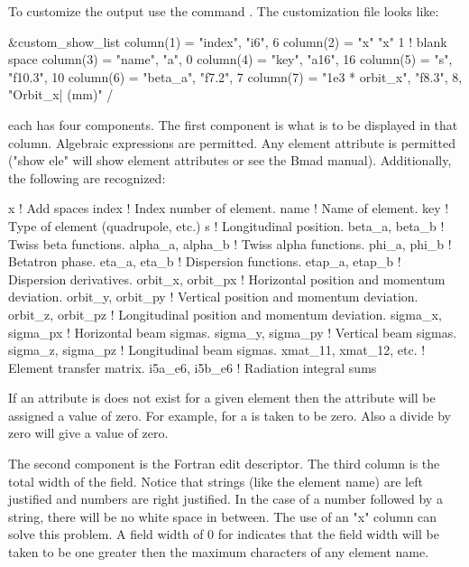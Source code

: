 {{{{\begin{description}
To customize the output use the command . The customization file looks like:
\begin{example}
  &custom_show_list
    column(1) = "index",   "i6",     6 
    column(2) = "x"        "x"       1       ! blank space
    column(3) = "name",    "a",      0
    column(4) = "key",     "a16",   16
    column(5) = "s",       "f10.3", 10
    column(6) = "beta_a",  "f7.2",   7
    column(7) = "1e3 * orbit_x", "f8.3", 8, "Orbit_x| (mm)" 
  /
\end{example}
each  has four components. The first component is what
is to be displayed in that column. Algebraic expressions are
permitted. Any element attribute is permitted ("show ele" will show
element attributes or see the Bmad manual). Additionally, the following
are recognized:
\begin{example}
  x                           ! Add spaces
  index                       ! Index number of element.
  name                        ! Name of element.
  key                         ! Type of element (quadrupole, etc.)
  s                           ! Longitudinal position.
  beta_a,  beta_b             ! Twiss beta functions.
  alpha_a, alpha_b            ! Twiss alpha functions.
  phi_a,   phi_b              ! Betatron phase.
  eta_a,   eta_b              ! Dispersion functions.
  etap_a,  etap_b             ! Dispersion derivatives.
  orbit_x, orbit_px           ! Horizontal position and momentum deviation.
  orbit_y, orbit_py           ! Vertical position and momentum deviation.
  orbit_z, orbit_pz           ! Longitudinal position and momentum deviation.
  sigma_x, sigma_px           ! Horizontal beam sigmas.
  sigma_y, sigma_py           ! Vertical beam sigmas.
  sigma_z, sigma_pz           ! Longitudinal beam sigmas.
  xmat_11, xmat_12, etc.      ! Element transfer matrix.
  i5a_e6,  i5b_e6             ! Radiation integral sums
\end{example}
If an attribute is does not exist for a given element then the
attribute will be assigned a value of zero. For example, 
for a  is taken to be zero. Also a divide by zero will
give a value of zero.

The second component is the Fortran edit descriptor. The third column
is the total width of the field. Notice that strings (like the element
name) are left justified and numbers are right justified. In the case
of a number followed by a string, there will be no white space in
between. The use of an "x" column can solve this problem. A field width
of 0 for  indicates that the field width will be taken to be
one greater then the maximum characters of any element name.


\end{description}}}}}
